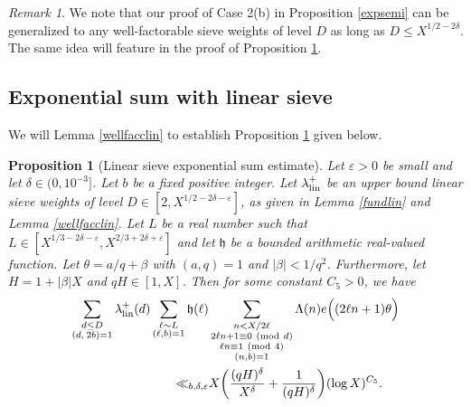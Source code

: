 \documentclass[12pt]{amsart}
\numberwithin{equation}{section}
\newtheorem{prop}[theorem]{Proposition}
\theoremstyle{remark}
\newtheorem*{remark}{Remark}
\theoremstyle{definition}
\newcommand{\imod}[1]{\ (\mathrm{mod}\ #1)}
\begin{document}
\begin{remark}
We note that our proof of Case 2(b) in Proposition \ref{expsemi} can be generalized to any well-factorable sieve weights of level $D$ as long as $D\leq X^{1/2-2\delta}$. The same idea will feature in the proof of Proposition \ref{explin}.
\end{remark}





\subsection{Exponential sum with linear sieve}
We will Lemma \ref{wellfacclin} to establish Proposition \ref{explin} given below.


\begin{prop}[Linear sieve exponential sum estimate]\label{explin}
Let $\varepsilon>0$ be small and let $\delta\in (0, 10^{-3}]$. Let $b$ be a fixed positive integer. Let $\lambda_{\textup{lin}}^+$ be an upper bound linear sieve  weights of level $D\in [2, X^{1/2-2\delta-\varepsilon}]$, as given in Lemma \ref{fundlin} and Lemma \ref{wellfacclin}. Let $L$ be a real number such that $L\in [X^{1/3-2\delta-\varepsilon}, X^{2/3+2\delta+\varepsilon}]$ and let $\mathfrak{h}$ be a bounded arithmetic real-valued function. Let $\theta= a/q + \beta$ with $(a, q)=1$ and $|\beta|<1/q^2$. Furthermore, let $H=1+|\beta|X$ and $qH\in [1, X]$. Then for some constant $C_5>0$, we have 
\begin{align}\label{linearexpestimate}
\notag \sum_{\substack{d\leq D\\(d,\: 2b)=1}}\lambda_{\textup{lin}}^+(d)\sum_{\substack{\ell\sim L\\(\ell,b)=1}}\mathfrak{h}(\ell)&\sum_{\substack{n<X/2\ell\\2\ell n+1\equiv 0\imod {d}\\ \ell n\equiv 1\imod 4\\(n,b)=1}}\Lambda(n)e\Big((2\ell n+1)\theta\Big)\\
\ll_{b, \delta, \varepsilon} &  X\bigg(\dfrac{(qH)^{\delta}}{X^\delta} + \dfrac{1}{(qH)^\delta}\bigg)(\log X)^{C_5}.
\end{align}
\end{prop}
\end{document}
